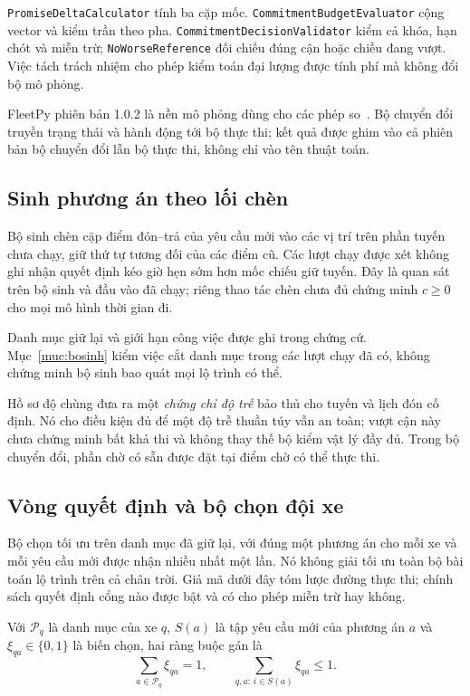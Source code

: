 \texttt{PromiseDeltaCalculator} tính ba cặp mốc. \texttt{CommitmentBudgetEvaluator} cộng
vector và kiểm trần theo pha. \texttt{CommitmentDecisionValidator} kiểm cả khóa, hạn chót
và miễn trừ; \texttt{NoWorseReference} đối chiếu đúng cận hoặc chiều đang vượt. Việc tách
trách nhiệm cho phép kiểm toán đại lượng được tính phí mà không đổi bộ mô phỏng.

FleetPy phiên bản 1.0.2 là nền mô phỏng dùng cho các phép so~\cite{fleetpy2022}. Bộ chuyển đổi
truyền trạng thái và hành động tới bộ thực thi; kết quả được ghim vào cả phiên bản bộ chuyển đổi lẫn
bộ thực thi, không chỉ vào tên thuật toán.

\subsection{Sinh phương án theo lối chèn}

Bộ sinh chèn cặp điểm đón--trả của yêu cầu mới vào các vị trí trên phần tuyến chưa chạy,
giữ thứ tự tương đối của các điểm cũ. Các lượt chạy được xét không ghi nhận quyết định
kéo giờ hẹn sớm hơn mốc chiếu giữ tuyến. Đây là quan sát trên bộ sinh và đầu vào đã chạy; riêng
thao tác chèn chưa đủ chứng minh $c\ge0$ cho mọi mô hình thời gian đi.

Danh mục giữ lại và giới hạn công việc được ghi trong chứng cứ. Mục~\ref{muc:bosinh}
kiểm việc cắt danh mục trong các lượt chạy đã có, không chứng minh bộ sinh bao quát mọi
lộ trình có thể.

Hồ sơ độ chùng đưa ra một \emph{chứng chỉ độ trễ} bảo thủ cho tuyến và lịch đón cố định.
Nó cho điều kiện đủ để một độ trễ thuần túy vẫn an toàn; vượt cận này chưa chứng minh bất
khả thi và không thay thế bộ kiểm vật lý đầy đủ. Trong bộ chuyển đổi, phần chờ có sẵn được đặt
tại điểm chờ có thể thực thi.

\subsection{Vòng quyết định và bộ chọn đội xe}
\label{muc:bochon}

Bộ chọn tối ưu trên danh mục đã giữ lại, với đúng một phương án cho mỗi xe và mỗi yêu
cầu mới được nhận nhiều nhất một lần. Nó không giải tối ưu toàn bộ bài toán lộ trình
trên cả chân trời. Giả mã dưới đây tóm lược đường thực thi; chính sách quyết định
cổng nào được bật và có cho phép miễn trừ hay không.

Với $\mathcal{P}_q$ là danh mục của xe $q$, $S(a)$ là tập yêu cầu mới của phương án $a$
và $\xi_{qa}\in\{0,1\}$ là biến chọn, hai ràng buộc gán là
\[
\sum_{a\in\mathcal{P}_q}\xi_{qa}=1,\qquad
\sum_{q,a:\,i\in S(a)}\xi_{qa}\le1.
\]

